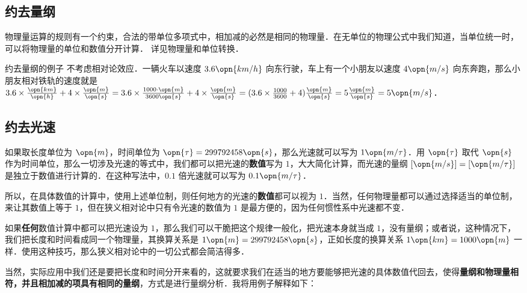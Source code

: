 

\subsection{约去量纲}

物理量运算的规则有一个约束，合法的带单位多项式中，相加减的必然是相同的物理量．在无单位的物理公式中我们知道，当单位统一时，可以将物理量的单位和数值分开计算． 详见物理量和单位转换．

\begin{example}{约去量纲的例子}
不考虑相对论效应．一辆火车以速度 $3.6\opn{km/h}$ 向东行驶，车上有一个小朋友以速度 $4\opn{m/s}$ 向东奔跑，那么小朋友相对铁轨的速度就是 $3.6\times\frac{\opn{km}}{\opn{h}}+4\times\frac{\opn{m}}{\opn{s}}=3.6\times\frac{1000\cdot \opn{m}}{3600\opn{s}}+4\times\frac{\opn{m}}{\opn{s}}=(3.6\times\frac{1000}{3600}+4)\frac{\opn{m}}{\opn{s}}=5\frac{\opn{m}}{\opn{s}}=5\opn{m/s}$．
\end{example}

\subsection{约去光速}

如果取长度单位为 $\opn{m}$，时间单位为 $\opn{\tau}=299792458\opn{s}$，那么光速就可以写为 $1\opn{m/\tau}$．用 $\opn{\tau}$ 取代 $\opn{s}$ 作为时间单位，那么一切涉及光速的等式中，我们都可以把光速的\textbf{数值}写为 $1$，大大简化计算，而光速的量纲 $[\opn{m/s}]=[\opn{m/\tau}]$ 是独立于数值进行计算的．在这种写法中，$0.1$ 倍光速就可以写为 $0.1\opn{m/\tau}$．

所以，在具体数值的计算中，使用上述单位制，则任何地方的光速的\textbf{数值}都可以视为 $1$．当然，任何物理量都可以通过选择适当的单位制，来让其数值上等于 $1$，但在狭义相对论中只有令光速的数值为 $1$ 是最方便的，因为任何惯性系中光速都不变．

如果\textbf{任何}数值计算中都可以把光速设为 $1$，那么我们可以干脆把这个规律一般化，把光速本身就当成 $1$，没有量纲；或者说，这种情况下，我们把长度和时间看成同一个物理量，其换算关系是 $1\opn{m}=299792458\opn{s}$，正如长度的换算关系 $1\opn{km}=1000\opn{m}$ 一样．使用这种技巧，那么狭义相对论中的一切公式都会简洁得多．

当然，实际应用中我们还是要把长度和时间分开来看的，这就要求我们在适当的地方要能够把光速的具体数值代回去，使得\textbf{量纲和物理量相符，并且相加减的项具有相同的量纲}，方式是进行量纲分析．我将用例子解释如下：

